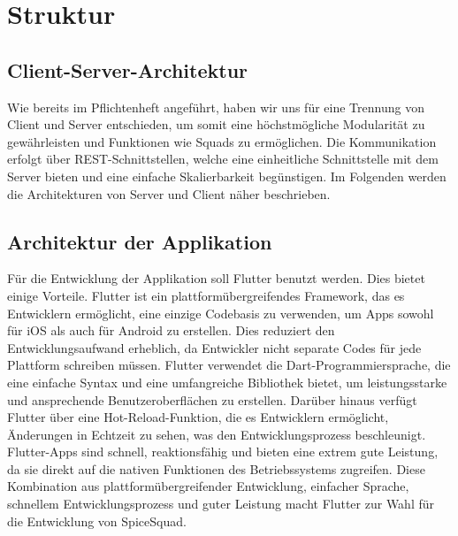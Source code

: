 \documentclass[parskip=full]{scrartcl}
\begin{document}
\section{Struktur}

\subsection{Client-Server-Architektur}
Wie bereits im Pflichtenheft angeführt, haben wir uns für eine Trennung von Client und Server entschieden, um somit eine höchstmögliche Modularität zu gewährleisten und
Funktionen wie Squads zu ermöglichen. Die Kommunikation erfolgt über REST-Schnittstellen, welche eine einheitliche Schnittstelle mit dem Server bieten und eine einfache Skalierbarkeit begünstigen.
Im Folgenden werden die Architekturen von Server und Client näher beschrieben.

\subsection{Architektur der Applikation}
Für die Entwicklung der Applikation soll Flutter benutzt werden. Dies bietet einige Vorteile. Flutter ist ein plattformübergreifendes Framework, das es Entwicklern ermöglicht, eine einzige Codebasis zu verwenden, um Apps sowohl für iOS als auch für Android zu erstellen. Dies reduziert den Entwicklungsaufwand erheblich, da Entwickler nicht separate Codes für jede Plattform schreiben müssen. Flutter verwendet die Dart-Programmiersprache, die eine einfache Syntax und eine umfangreiche Bibliothek bietet, um leistungsstarke und ansprechende Benutzeroberflächen zu erstellen. Darüber hinaus verfügt Flutter über eine Hot-Reload-Funktion, die es Entwicklern ermöglicht, Änderungen in Echtzeit zu sehen, was den Entwicklungsprozess beschleunigt. Flutter-Apps sind schnell, reaktionsfähig und bieten eine extrem gute Leistung, da sie direkt auf die nativen Funktionen des Betriebssystems zugreifen. Diese Kombination aus plattformübergreifender Entwicklung, einfacher Sprache, schnellem Entwicklungsprozess und guter Leistung macht Flutter zur Wahl für die Entwicklung von SpiceSquad.
\end{document}
